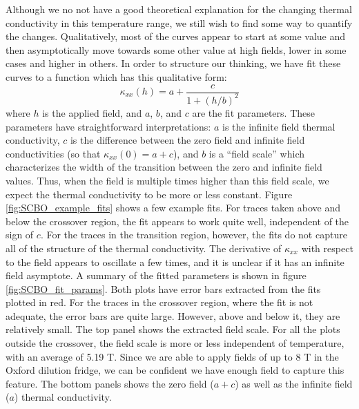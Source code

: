 \documentclass{thesis-umich}
\begin{document}
Although we no not have a good theoretical explanation for the changing thermal conductivity in this temperature range, we still wish to find some way to quantify the changes. Qualitatively, most of the curves appear to start at some value and then asymptotically move towards some other value at high fields, lower in some cases and higher in others. In order to structure our thinking, we have fit these curves to a function which has this qualitative form:
\[ \kappa_{xx}(h) = a + \frac{c}{1 + (h/b)^2}\]
where $h$ is the applied field, and $a$, $b$, and $c$ are the fit parameters. These parameters have straightforward interpretations: $a$ is the infinite field thermal conductivity, $c$ is the difference between the zero field and infinite field conductivities (so that $\kappa_{xx}(0) = a + c$), and $b$ is a ``field scale'' which characterizes the width of the transition between the zero and infinite field values. Thus, when the field is multiple times higher than this field scale, we expect the thermal conductivity to be more or less constant. Figure \ref{fig:SCBO_example_fits} shows a few example fits. For traces taken above and below the crossover region, the fit appears to work quite well, independent of the sign of $c$. For the traces in the transition region, however, the fits do not capture all of the structure of the thermal conductivity. The derivative of $\kappa_{xx}$ with respect to the field appears to oscillate a few times, and it is unclear if it has an infinite field asymptote. A summary of the fitted parameters is shown in figure \ref{fig:SCBO_fit_params}. Both plots have error bars extracted from the fits plotted in red. For the traces in the crossover region, where the fit is not adequate, the error bars are quite large. However, above and below it, they are relatively small. The top panel shows the extracted field scale. For all the plots outside the crossover, the field scale is more or less independent of temperature, with an average of 5.19 T. Since we are able to apply fields of up to 8 T in the Oxford dilution fridge, we can be confident we have enough field to capture this feature. The bottom panels shows the zero field ($a + c$) as well as the infinite field ($a$) thermal conductivity. 
\end{document}

